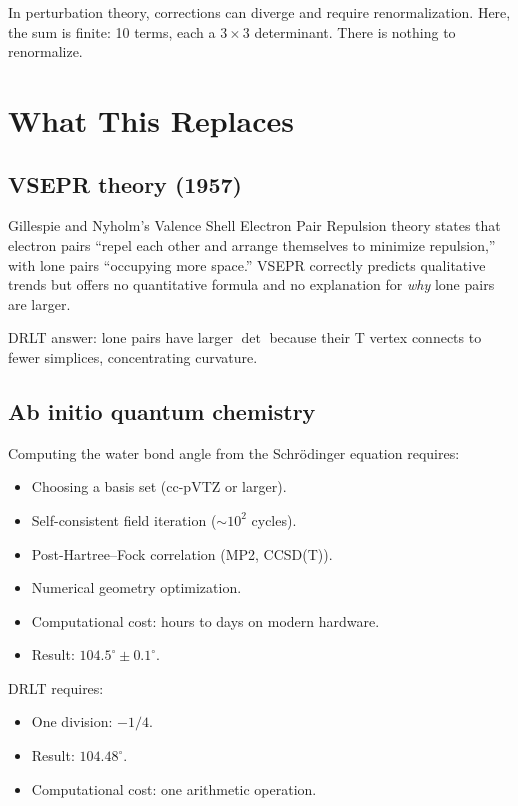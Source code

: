 \documentclass[12pt]{article}
\theoremstyle{remark}
\begin{document}
In perturbation theory, corrections can diverge and require renormalization. Here, the sum is finite: 10 terms, each a $3 \times 3$ determinant. There is nothing to renormalize.

\section{What This Replaces}

\subsection{VSEPR theory (1957)}

Gillespie and Nyholm's Valence Shell Electron Pair Repulsion theory states that electron pairs ``repel each other and arrange themselves to minimize repulsion,'' with lone pairs ``occupying more space.'' VSEPR correctly predicts qualitative trends but offers no quantitative formula and no explanation for \emph{why} lone pairs are larger.

DRLT answer: lone pairs have larger $\det$ because their T vertex connects to fewer simplices, concentrating curvature.

\subsection{Ab initio quantum chemistry}

Computing the water bond angle from the Schr\"odinger equation requires:
\begin{itemize}
\item Choosing a basis set (cc-pVTZ or larger).
\item Self-consistent field iteration ($\sim 10^2$ cycles).
\item Post-Hartree--Fock correlation (MP2, CCSD(T)).
\item Numerical geometry optimization.
\item Computational cost: hours to days on modern hardware.
\item Result: $104.5^\circ \pm 0.1^\circ$.
\end{itemize}

DRLT requires:
\begin{itemize}
\item One division: $-1/4$.
\item Result: $104.48^\circ$.
\item Computational cost: one arithmetic operation.
\end{itemize}
\end{document}
